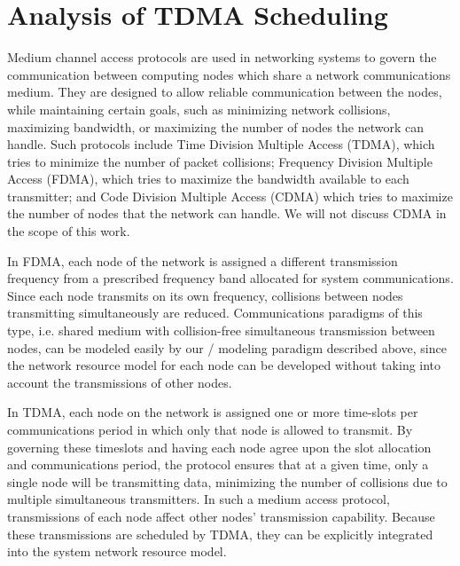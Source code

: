 \newpage

\section{Analysis of TDMA Scheduling}
\label{sec:tdma}

Medium channel access protocols are used in networking systems to
govern the communication between computing nodes which share a network
communications medium.  They are designed to allow reliable
communication between the nodes, while maintaining certain goals, such
as minimizing network collisions, maximizing bandwidth, or maximizing
the number of nodes the network can handle.  Such protocols include
Time Division Multiple Access (TDMA), which tries to minimize the
number of packet collisions; Frequency Division Multiple Access
(FDMA), which tries to maximize the bandwidth available to each
transmitter; and Code Division Multiple Access (CDMA) which tries to
maximize the number of nodes that the network can
handle\cite{jung1993advantagesCDMAFDMATDMA}.  We will not discuss CDMA
in the scope of this work.

In FDMA, each node of the network is assigned a different transmission
frequency from a prescribed frequency band allocated for system
communications.  Since each node transmits on its own frequency,
collisions between nodes transmitting simultaneously are reduced.
Communications paradigms of this type, i.e. shared medium with
collision-free simultaneous transmission between nodes, can be modeled
easily by our \shorttool/ modeling paradigm described above, since the
network resource model for each node can be developed without taking
into account the transmissions of other nodes.

In TDMA, each node on the network is assigned one or more time-slots
per communications period in which only that node is allowed to
transmit.  By governing these timeslots and having each node agree
upon the slot allocation and communications period, the protocol
ensures that at a given time, only a single node will be transmitting
data, minimizing the number of collisions due to multiple simultaneous
transmitters.  In such a medium access protocol, transmissions of each
node affect other nodes' transmission capability.  Because these
transmissions are scheduled by TDMA, they can be explicitly integrated
into the system network resource model.

